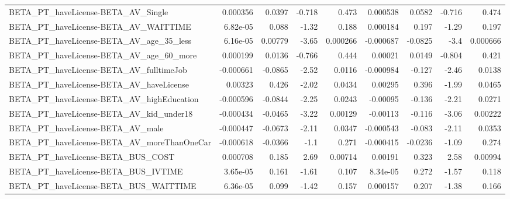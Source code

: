 \begin{tabular}{lrrrrrrrr}
BETA\_PT\_haveLicense-BETA\_AV\_Single                 &    0.000356 &       0.0397 &   -0.718 &    0.473 &   0.000538 &      0.0582 &       -0.716 &         0.474 \\
BETA\_PT\_haveLicense-BETA\_AV\_WAITTIME               &    6.82e-05 &        0.088 &    -1.32 &    0.188 &   0.000184 &       0.197 &        -1.29 &         0.197 \\
BETA\_PT\_haveLicense-BETA\_AV\_age\_35\_less            &    6.16e-05 &      0.00779 &    -3.65 & 0.000266 &  -0.000687 &     -0.0825 &         -3.4 &      0.000666 \\
BETA\_PT\_haveLicense-BETA\_AV\_age\_60\_more            &    0.000199 &       0.0136 &   -0.766 &    0.444 &    0.00021 &      0.0149 &       -0.804 &         0.421 \\
BETA\_PT\_haveLicense-BETA\_AV\_fulltimeJob            &   -0.000661 &      -0.0865 &    -2.52 &   0.0116 &  -0.000984 &      -0.127 &        -2.46 &        0.0138 \\
BETA\_PT\_haveLicense-BETA\_AV\_haveLicense            &     0.00323 &        0.426 &    -2.02 &   0.0434 &    0.00295 &       0.396 &        -1.99 &        0.0465 \\
BETA\_PT\_haveLicense-BETA\_AV\_highEducation          &   -0.000596 &      -0.0844 &    -2.25 &   0.0243 &   -0.00095 &      -0.136 &        -2.21 &        0.0271 \\
BETA\_PT\_haveLicense-BETA\_AV\_kid\_under18            &   -0.000434 &      -0.0465 &    -3.22 &  0.00129 &   -0.00113 &      -0.116 &        -3.06 &       0.00222 \\
BETA\_PT\_haveLicense-BETA\_AV\_male                   &   -0.000447 &      -0.0673 &    -2.11 &   0.0347 &  -0.000543 &      -0.083 &        -2.11 &        0.0353 \\
BETA\_PT\_haveLicense-BETA\_AV\_moreThanOneCar         &   -0.000618 &      -0.0366 &     -1.1 &    0.271 &  -0.000415 &     -0.0236 &        -1.09 &         0.274 \\
BETA\_PT\_haveLicense-BETA\_BUS\_COST                  &    0.000708 &        0.185 &     2.69 &  0.00714 &    0.00191 &       0.323 &         2.58 &       0.00994 \\
BETA\_PT\_haveLicense-BETA\_BUS\_IVTIME                &    3.65e-05 &        0.161 &    -1.61 &    0.107 &   8.34e-05 &       0.272 &        -1.57 &         0.118 \\
BETA\_PT\_haveLicense-BETA\_BUS\_WAITTIME              &    6.36e-05 &        0.099 &    -1.42 &    0.157 &   0.000157 &       0.207 &        -1.38 &         0.166 \\

\end{tabular}
